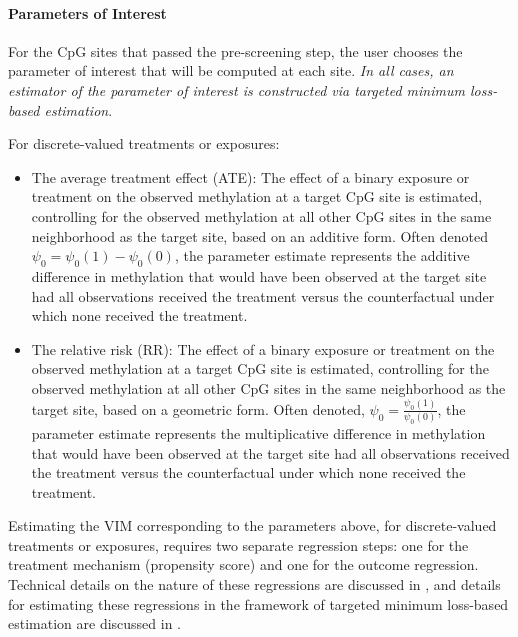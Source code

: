 \documentclass[9pt,a4paper,]{extarticle}
\theoremstyle{definition}
\theoremstyle{definition}
\theoremstyle{definition}
\theoremstyle{remark}
\begin{document}
\hypertarget{parameters-of-interest}{%
\paragraph{Parameters of Interest}\label{parameters-of-interest}}

For the CpG sites that passed the pre-screening step, the user chooses the
parameter of interest that will be computed at each site. \emph{In all cases, an
estimator of the parameter of interest is constructed via targeted minimum
loss-based estimation}.

For discrete-valued treatments or exposures:

\begin{itemize}
\item
  The average treatment effect (ATE): The effect of a binary exposure or
  treatment on the observed methylation at a target CpG site is estimated,
  controlling for the observed methylation at all other CpG sites in the same
  neighborhood as the target site, based on an additive form. Often denoted
  \(\psi_0 = \psi_0(1) - \psi_0(0)\), the parameter estimate represents the
  additive difference in methylation that would have been observed at the
  target site had all observations received the treatment versus the
  counterfactual under which none received the treatment.
\item
  The relative risk (RR): The effect of a binary exposure or treatment on the
  observed methylation at a target CpG site is estimated, controlling for the
  observed methylation at all other CpG sites in the same neighborhood as the
  target site, based on a geometric form. Often denoted,
  \(\psi_0 = \frac{\psi_0(1)}{\psi_0(0)}\), the parameter estimate represents the
  multiplicative difference in methylation that would have
  been observed at the target site had all observations received the treatment
  versus the counterfactual under which none received the treatment.
\end{itemize}

Estimating the VIM corresponding to the parameters above, for discrete-valued
treatments or exposures, requires two separate regression steps: one for the
treatment mechanism (propensity score) and one for the outcome regression.
Technical details on the nature of these regressions are discussed in
\citet{hernan2018causal}, and details for estimating these regressions in the
framework of targeted minimum loss-based estimation are discussed in
\citet{vdl2011targeted}.
\end{document}
